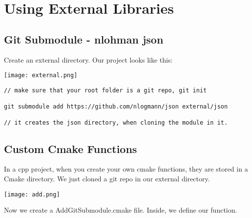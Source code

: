 \documentclass[openany]{report}
\begin{document}
\section{Using External Libraries}


\subsection{Git Submodule - nlohman json}

Create an external directory. Our project looks like this:

\begin{center}
    \texttt{[image: external.png]}
\end{center}

\begin{verbatim}
// make sure that your root folder is a git repo, git init

git submodule add https://github.com/nlogmann/json external/json

// it creates the json directory, when cloning the module in it.
\end{verbatim}

\subsection{Custom Cmake Functions}

In a cpp project, when you create your own cmake functions, they are stored in a Cmake directory. We just cloned a 
git repo in our external directory.

\begin{center}
    \texttt{[image: add.png]}
\end{center}

Now we create a AddGitSubmodule.cmake file. Inside, we define our function.
\end{document}

